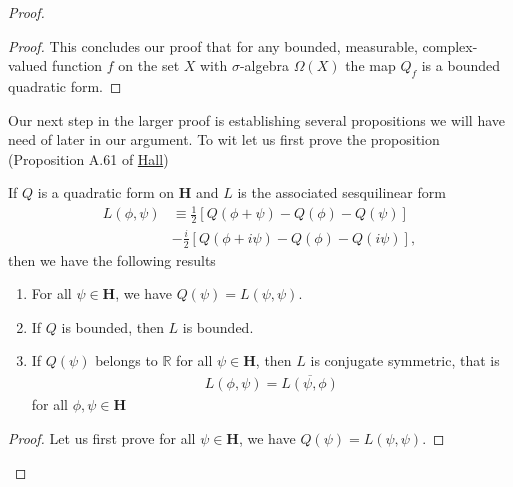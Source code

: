 \begin{proof}
\begin{proof}
This concludes our proof that for any bounded, measurable, complex-valued function $f$ on the set $X$ with $\sigma$-algebra $\Omega(X)$ the map $Q_f$ is a bounded quadratic form.
\end{proof}

Our next step in the larger proof is establishing several propositions we will have need of later in our argument. To wit let us first prove the proposition (Proposition A.61 of \href{https://doi.org/10.1007/978-1-4614-7116-5}{Hall})

\begin{proposition}
    \label{prpstn:hall-a.61}
    \leanok
    If $Q$ is a quadratic form on $\mathbf{H}$ and $L$ is the associated sesquilinear form
    \begin{align}
        L(\phi, \psi) &\equiv \frac{1}{2} \left[ Q(\phi + \psi) - Q(\phi) - Q(\psi) \right] \\
                      &-\frac{i}{2} \left[ Q(\phi + i\psi) - Q(\phi) - Q(i\psi) \right],
    \end{align}
    then we have the following results
    \begin{enumerate}
        \item For all $\psi \in \mathbf{H}$, we have $Q(\psi) = L(\psi, \psi)$.
        \item If $Q$ is bounded, then $L$ is bounded.
        \item If $Q(\psi)$ belongs to $\mathbb{R}$ for all $\psi \in \mathbf{H}$, then $L$ is conjugate symmetric, that is
        \begin{align}
            L(\phi, \psi) = \overline{L(\psi, \phi)}
        \end{align}
        for all $\phi, \psi \in \mathbf{H}$
    \end{enumerate}
\end{proposition}
\begin{proof}
    \leanok
Let us first prove for all $\psi \in \mathbf{H}$, we have $Q(\psi) = L(\psi, \psi)$.


\end{proof}
\end{proof}
